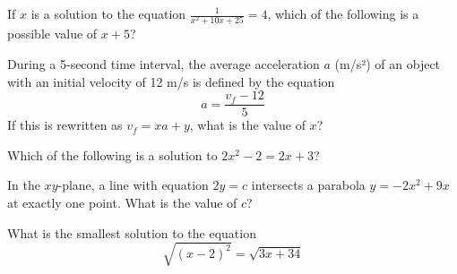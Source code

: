 \newpage

\noindent\markforreview
\vspace{1em}

If \(x\) is a solution to the equation \(\frac{1}{x^2 + 10x + 25} = 4\),  
which of the following is a possible value of \(x + 5\)?

\vspace{0.75em}


\vspace{2em}

\noindent\markforreview
\vspace{1em}

During a 5-second time interval, the average acceleration \(a\) (m/s²) of an object  
with an initial velocity of 12 m/s is defined by the equation  
\[
a = \frac{v_f - 12}{5}
\]  
If this is rewritten as \(v_f = xa + y\), what is the value of \(x\)?

\vspace{0.75em}

\newpage

\noindent\markforreview
\vspace{1em}

Which of the following is a solution to  
\(2x^2 - 2 = 2x + 3\)?

\vspace{0.75em}


\vspace{2em}

\noindent\markforreview
\vspace{1em}

In the \(xy\)-plane, a line with equation \(2y = c\) intersects a parabola  
\(y = -2x^2 + 9x\) at exactly one point.  
What is the value of \(c\)?

\vspace{0.75em}

\newpage


\noindent\markforreview
\vspace{1em}

What is the smallest solution to the equation  
\[
\sqrt{(x - 2)^2} = \sqrt{3x + 34}
\]

\vspace{0.75em}



